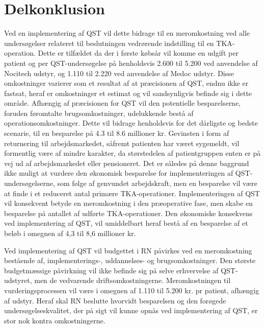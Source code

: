 \section{Delkonklusion}
Ved en implementering af QST vil dette bidrage til en meromkostning ved alle undersøgelser relateret til beslutningen vedrørende indstilling til en TKA-operation. Dette er tilfældet da der i første købsår vil komme en udgift per patient og per QST-undersøgelse på henholdsvis 2.600 til 5.200 ved anvendelse af Nocitech udstyr, og 1.110 til 2.220 ved anvendelse af Medoc udstyr. Disse omkostninger varierer som et resultat af at præcisionen af QST, endnu ikke er fastsat, heraf er omkostninger et estimat og vil sandsynligvis befinde sig i dette område. Afhængig af præcisionen for QST vil den potentielle besparelserne, foruden føromtalte brugsomkostninger, udelukkende bestå af operationsomkostninger. Dette vil bidrage henholdsvis for det dårligste og bedste scenarie, til en besparelse på 4.3 til 8.6 millioner kr. Gevinsten i form af returnering til arbejdsmarkedet, såfremt patienten har været sygemeldt, vil formentlig være af mindre karakter, da størstedelen af patientgruppen enten er på vej ud af arbejdsmarkedet eller pensioneret. Det er således på denne baggrund ikke muligt at vurdere den økonomisk besparelse for implementeringen af QST-undersøgelserne, som følge af genvundet arbejdskraft, men en besparelse vil være at finde i et reduceret antal primære TKA-operationer. Implementeringen af QST vil konsekvent betyde en meromkostning i den præoperative fase, men skabe en besparelse på antallet af udførte TKA-operationer. Den økonomiske konsekvens ved implementering af QST, vil umiddelbart heraf bestå af en besparelse af et beløb i omegnen af 4,3 til 8,6 millioner kr.

Ved implementering af QST vil budgettet i RN påvirkes ved en meromkostning bestående af, implementerings-, uddannelses- og brugsomkostninger. Den største budgetmæssige påvirkning vil ikke befinde sig på selve erhvervelse af QST-udstyret, men de vedvarende driftsomkostningerne. Meromkostningen til vurderingsprocessen vil være i omegnen af 1.110 til 5.200 kr. pr patient, afhængig af udstyr. Heraf skal RN beslutte hvorvidt besparelsen og den forøgede undersøgelseskvalitet, der på sigt vil kunne opnås ved implementering af QST, er stor nok kontra omkostningerne. 